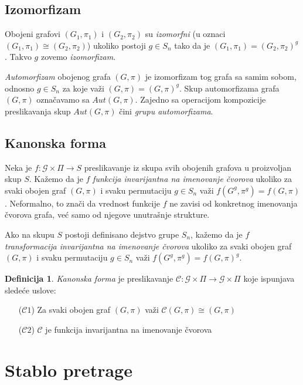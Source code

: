 \documentclass[12pt,oneside]{memoir}
\theoremstyle{definition}
\newtheorem*{definition}{Definicija}
\begin{document}
   \subsection{Izomorfizam}

   Obojeni grafovi $(G_1, \pi_1)$ i $(G_2, \pi_2)$ su \emph{izomorfni} (u oznaci
   $(G_1, \pi_1) \cong (G_2, \pi_2)$) ukoliko postoji $g \in S_n$ tako da je
   $(G_1, \pi_1) = (G_2, \pi_2)^g$. Takvo $g$ zovemo \emph{izomorfizam}.

   \emph{Automorfizam} obojenog grafa $(G, \pi)$ je izomorfizam tog grafa sa
   samim sobom, odnosno $g \in S_n$ za koje važi $(G, \pi) = (G, \pi)^g$. Skup
   automorfizama grafa $(G, \pi)$ označavamo sa $Aut(G, \pi)$. Zajedno sa
   operacijom kompozicije preslikavanja skup $Aut(G, \pi)$ čini \emph{grupu
   automorfizama}.


   \subsection{Kanonska forma}

   Neka je $f : \mathcal{G} \times \Pi \to S$ preslikavanje iz skupa svih
   obojenih grafova u proizvoljan skup $S$.  Kažemo da je $f$ \emph{funkcija
   invarijantna na imenovanje čvorova} ukoliko za svaki obojen graf $(G, \pi)$
   i svaku permutaciju $g \in S_n$ važi $f(G^g, \pi^g) = f(G, \pi)$.
   Neformalno, to znači da vrednost funkcije $f$ ne zavisi od konkretnog
   imenovanja čvorova grafa, već samo od njegove unutrašnje strukture.

   Ako na skupu $S$ postoji definisano dejstvo grupe $S_n$, kažemo da je $f$
   \emph{transformacija invarijantna na imenovanje čvorova} ukoliko za svaki
   obojen graf $(G, \pi)$ i svaku permutaciju $g \in S_n$ važi $f(G^g, \pi^g) =
   f(G, \pi)^g$.


   \begin{definition}
	   \emph{Kanonska forma} je preslikavanje $\mathcal{C} : \mathcal{G} \times \Pi \to
	   \mathcal{G} \times \Pi$ koje ispunjava sledeće uslove:
	   \begin{itemize}
		   \item[($\mathcal{C}1$)] Za svaki obojen graf $(G, \pi)$ važi
			   $\mathcal{C}(G, \pi) \cong (G,
			\pi)$
		\item[($\mathcal{C}2$)] $\mathcal{C}$ je funkcija invarijantna na
			imenovanje čvorova
	   \end{itemize}
   \end{definition}


 \section{Stablo pretrage}
\end{document}
